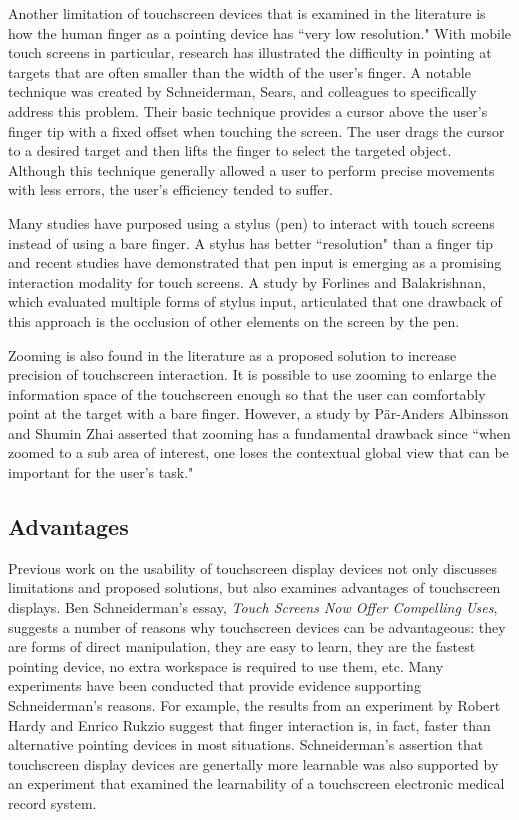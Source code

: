 \documentclass[11pt]{article}
\begin{document}
Another limitation of touchscreen devices that is examined in the literature is how the human finger as a pointing device has ``very low resolution."\cite{Albinsson} With mobile touch screens in particular, research has illustrated the difficulty in pointing at targets that are often smaller than the width of the user's finger. A notable technique was created by Schneiderman, Sears, and colleagues to specifically address this problem.\cite{Sears} Their basic technique provides a cursor above the user's finger tip with a fixed offset when touching the screen. The user drags the cursor to a desired target and then lifts the finger to select the targeted object. Although this technique generally allowed a user to perform precise movements with less errors, the user's efficiency tended to suffer.\cite{Sears}

Many studies have purposed using a stylus (pen) to interact with touch screens instead of using a bare finger. A stylus has better ``resolution" than a finger tip and recent studies have demonstrated that pen input is emerging as a promising interaction modality for touch screens.\cite{Bi} A study by Forlines and Balakrishnan, which evaluated multiple forms of stylus input, articulated that one drawback of this approach is the occlusion of other elements on the screen by the pen.\cite{Forlines}

Zooming is also found in the literature as a proposed solution to increase precision of touchscreen interaction. It is possible to use zooming to enlarge the information space of the touchscreen enough so that the user can comfortably point at the target with a bare finger. However, a study by P\"{a}r-Anders Albinsson and Shumin Zhai asserted that zooming has a fundamental drawback since ``when zoomed to a sub area of interest, one loses the contextual global view that can be important for the user's task."\cite{Albinsson} 

\subsection{Advantages}
Previous work on the usability of touchscreen display devices not only discusses limitations and proposed solutions, but also examines advantages of touchscreen displays. Ben Schneiderman's essay, \textit{Touch Screens Now Offer Compelling Uses}, suggests a number of reasons why touchscreen devices can be advantageous: they are forms of direct manipulation, they are easy to learn, they are the fastest pointing device, no extra workspace is required to use them, etc. \cite{73754} Many experiments have been conducted that provide evidence supporting Schneiderman's reasons. For example, the results from an experiment by Robert Hardy and Enrico Rukzio suggest that finger interaction is, in fact, faster than alternative pointing devices in most situations.\cite{Hardy:2008:TIT:1409240.1409267} Schneiderman's assertion that touchscreen display devices are genertally more learnable was also supported by an experiment that examined the learnability of a touchscreen electronic medical record system.\cite{Douglas:2011:SUL:2029976.2029990}
\end{document}
